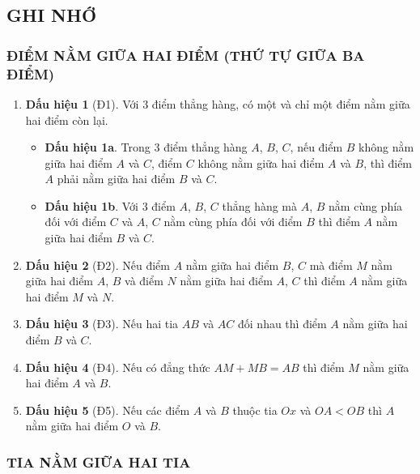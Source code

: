 \subsection{GHI NHỚ}

\subsubsection{ĐIỂM NẰM GIỮA HAI ĐIỂM (THỨ TỰ GIỮA BA ĐIỂM)}
\begin{enumerate}
	\item \textbf{Dấu hiệu 1} (Đ1). Với $3$ điểm thẳng hàng, có một và chỉ một điểm nằm giữa hai điểm còn lại.
	\begin{itemize}
		\item \textbf{Dấu hiệu 1a}. Trong $3$ điểm thẳng hàng $A$, $B$, $C$, nếu điểm $B$ không nằm giữa hai điểm $A$ và $C$, điểm $C$ không nằm giữa hai điểm $A$ và $B$, thì điểm $A$ phải nằm giữa hai điểm $B$ và $C$.
		\item \textbf{Dấu hiệu 1b}. Với $3$ điểm $A$, $B$, $C$ thẳng hàng mà $A$, $B$ nằm cùng phía đối với điểm $C$ và $A$, $C$ nằm cùng phía đối với điểm $B$ thì điểm $A$ nằm giữa hai điểm $B$ và $C$.
	\end{itemize}
	\item \textbf{Dấu hiệu 2} (Đ2). Nếu điểm $A$ nằm giữa hai điểm $B$, $C$ mà điểm $M$ nằm giữa hai điểm $A$, $B$ và điểm $N$ nằm giữa hai điểm $A$, $C$ thì điểm $A$  nằm giữa hai điểm $M$ và $N$.
	\item \textbf{Dấu hiệu 3} (Đ3). Nếu hai tia $AB$ và $AC$ đối nhau thì điểm $A$  nằm giữa hai điểm $B$ và $C$.
	\item \textbf{Dấu hiệu 4} (Đ4). Nếu có đẳng thức $AM+MB=AB$ thì điểm $M$  nằm giữa hai điểm $A$ và $B$.
	\item \textbf{Dấu hiệu 5} (Đ5). Nếu các điểm $A$ và $B$ thuộc tia $Ox$ và $OA<OB$ thì $A$ nằm giữa hai điểm $O$ và $B$.
\end{enumerate}

\subsubsection{TIA NẰM GIỮA HAI TIA}

